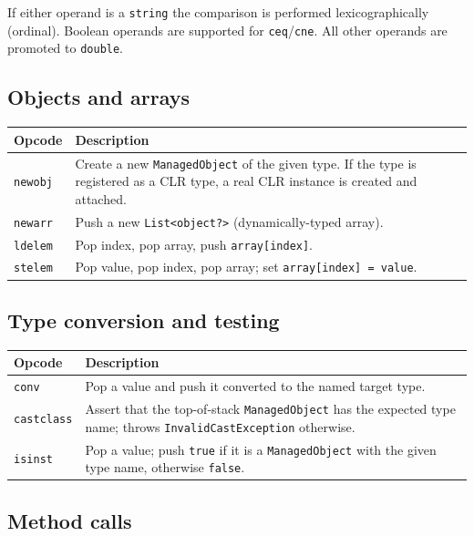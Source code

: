 \documentclass[11pt,a4paper]{article}
\begin{document}
If either operand is a \texttt{string} the comparison is performed
lexicographically (ordinal).  Boolean operands are supported for
\texttt{ceq}/\texttt{cne}.  All other operands are promoted to
\texttt{double}.

\subsection{Objects and arrays}

\begin{center}
\begin{tabular}{lp{9cm}}
\toprule
\textbf{Opcode} & \textbf{Description} \\
\midrule
\texttt{newobj}   & Create a new \texttt{ManagedObject} of the given type.  If the type is registered as a CLR type, a real CLR instance is created and attached. \\
\texttt{newarr}   & Push a new \texttt{List<object?>} (dynamically-typed array). \\
\texttt{ldelem}   & Pop index, pop array, push \texttt{array[index]}. \\
\texttt{stelem}   & Pop value, pop index, pop array; set \texttt{array[index] = value}. \\
\bottomrule
\end{tabular}
\end{center}

\subsection{Type conversion and testing}

\begin{center}
\begin{tabular}{lp{9cm}}
\toprule
\textbf{Opcode} & \textbf{Description} \\
\midrule
\texttt{conv}       & Pop a value and push it converted to the named target type. \\
\texttt{castclass}  & Assert that the top-of-stack \texttt{ManagedObject} has the expected type name; throws \texttt{InvalidCastException} otherwise. \\
\texttt{isinst}     & Pop a value; push \texttt{true} if it is a \texttt{ManagedObject} with the given type name, otherwise \texttt{false}. \\
\bottomrule
\end{tabular}
\end{center}

\subsection{Method calls}
\end{document}
